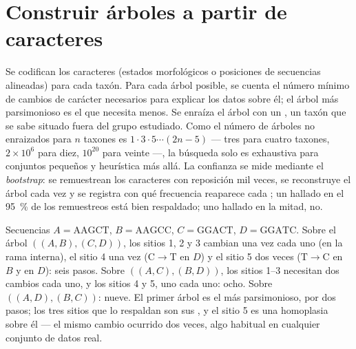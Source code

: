\section{Construir árboles a partir de caracteres}

\begin{method}[Parsimonia]\label{meth:b2:phylogenetic-trees:parsimony}
Se codifican los caracteres (estados morfológicos o posiciones de
secuencias alineadas) para cada taxón. Para cada árbol posible, se cuenta
el número mínimo de cambios de carácter necesarios para explicar los datos
sobre él; el árbol más parsimonioso es el que necesita menos. Se enraíza el
árbol con un \emph{}, un taxón que se sabe situado fuera del
grupo estudiado. Como el número de árboles no enraizados para $n$ taxones
es $1\cdot 3\cdot
5\cdots(2n - 5)$ --- tres para cuatro taxones, $2\times 10^{6}$ para diez,
$10^{20}$ para veinte ---, la búsqueda solo es exhaustiva para conjuntos
pequeños y heurística más allá. La confianza se mide mediante el
\emph{bootstrap}: se remuestrean los caracteres con reposición mil veces,
se reconstruye el árbol cada vez y se registra con qué frecuencia reaparece
cada ; un  hallado en el \qty{95}{\%} de los remuestreos está
bien respaldado; uno hallado en la mitad, no.
\end{method}

\begin{example}\label{ex:b2:phylogenetic-trees:parsimony}
Secuencias $A = \mathrm{AAGCT}$, $B = \mathrm{AAGCC}$, $C =
\mathrm{GGACT}$, $D = \mathrm{GGATC}$. Sobre el árbol $((A,B),(C,D))$,
los sitios 1, 2 y 3 cambian una vez cada uno (en la rama interna), el
sitio 4 una vez ($\mathrm{C}\to\mathrm{T}$ en $D$) y el sitio 5 dos veces
($\mathrm{T}\to\mathrm{C}$ en $B$ y en $D$): seis pasos. Sobre
$((A,C),(B,D))$, los sitios 1--3 necesitan dos cambios cada uno, y los
sitios 4 y 5, uno cada uno: ocho. Sobre $((A,D),(B,C))$: nueve. El primer
árbol es el más parsimonioso, por dos pasos; los tres sitios que lo
respaldan son sus , y el sitio 5 es una homoplasia sobre él
--- el mismo cambio ocurrido dos veces, algo habitual en cualquier conjunto
de datos real.
\end{example}

